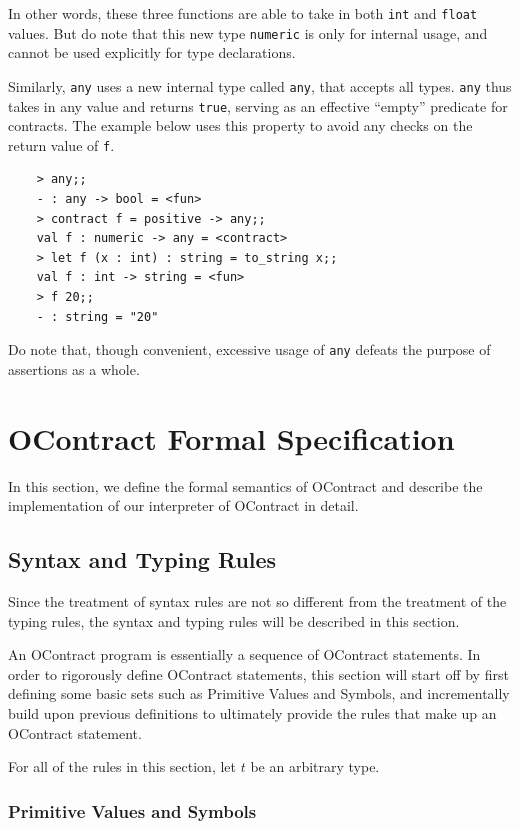 \documentclass[a4paper]{article}
\begin{document}
In other words, these three functions are able to take in both \texttt{int} and \texttt{float} values.
But do note that this new type \texttt{numeric} is only for internal usage, and cannot be used explicitly for type declarations.

Similarly, \texttt{any} uses a new internal type called \texttt{any}, that accepts all types.
\texttt{any} thus takes in any value and returns \texttt{true}, serving as an effective ``empty'' predicate for contracts.
The example below uses this property to avoid any checks on the return value of \texttt{f}.

\begin{verbatim}
    > any;;
    - : any -> bool = <fun>
    > contract f = positive -> any;;
    val f : numeric -> any = <contract>
    > let f (x : int) : string = to_string x;;
    val f : int -> string = <fun>
    > f 20;;
    - : string = "20"
\end{verbatim}

Do note that, though convenient, excessive usage of \texttt{any} defeats the purpose of assertions as a whole.

\section{OContract Formal Specification}
\label{developer}

In this section, we define the formal semantics of OContract and describe the implementation of our interpreter of OContract in detail.

\subsection{Syntax and Typing Rules}
Since the treatment of syntax rules are not so different from the treatment of the typing rules, the syntax and typing rules will be described in this section.

An OContract program is essentially a sequence of OContract statements. In order to rigorously define OContract statements,
this section will start off by first defining some basic sets such as Primitive Values and Symbols, and incrementally build upon
previous definitions to ultimately provide the rules that make up an OContract statement.

For all of the rules in this section, let $t$ be an arbitrary type.

\subsubsection{Primitive Values and Symbols}
\end{document}
